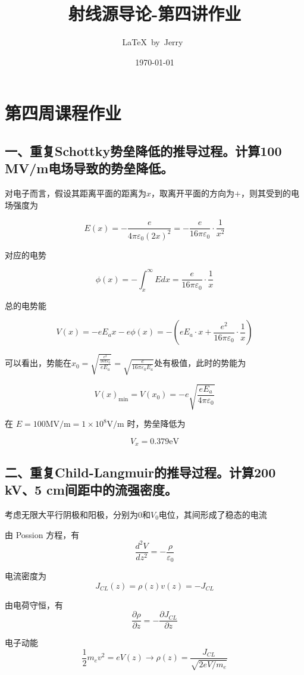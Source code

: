 \documentclass{article}
\title{射线源导论-第四讲作业}
\author{\LaTeX\ by\ Jerry\ }
\date{\today}
\begin{document}
\pagestyle{fancy}

\fancyhead[R]{\today}

\section*{第四周课程作业}

\subsection*{一、重复Schottky势垒降低的推导过程。计算100 MV/m电场导致的势垒降低。}

对电子而言，假设其距离平面的距离为$x$，取离开平面的方向为$+$，则其受到的电场强度为

$$E(x) = -\frac{e}{4\pi\varepsilon_0(2x)^2} = -\frac{e}{16\pi\varepsilon_0}\cdot\frac{1}{x^2}$$

对应的电势

$$\phi(x) = -\int_x^{\infty} Edx = \frac{e}{16\pi\varepsilon_0}\cdot\frac{1}{x}$$

总的电势能

$$ V(x) = -eE_ax - e\phi(x) = - (eE_a \cdot x + \frac{e^2}{16\pi\varepsilon_0}\cdot\frac{1}{x})$$

可以看出，势能在$x_0 = \sqrt{\frac{\frac{e^2}{16\pi\varepsilon_0}}{eE_a}} = \sqrt{\frac{e}{16\pi\varepsilon_0E_a}}$处有极值，此时的势能为

$$V(x)_{\text{min}} = V(x_0) = -e\sqrt{\frac{eE_a}{4\pi\varepsilon_0}}$$

在 $E = 100\text{MV/m} = 1 \times 10^8 \text{V/m}$ 时，势垒降低为

$$V_x = 0.379\text{eV}$$

\subsection*{二、重复Child-Langmuir的推导过程。计算200 kV、5 cm间距中的流强密度。}

考虑无限大平行阴极和阳极，分别为$0$和$V_0$电位，其间形成了稳态的电流

由 Possion 方程，有 $$ \frac{d^2V}{dz^2} = -\frac{\rho}{\varepsilon_0} $$

电流密度为 $$ J_{CL}(z) = \rho(z) v(z) = -J_{CL} $$

由电荷守恒，有 $$ \frac{\partial\rho}{\partial z} = -\frac{\partial J_{CL}}{\partial z} $$

电子动能 $$ \frac{1}{2}m_ev^2 = eV(z) \rightarrow \rho(z) = \frac{J_{CL}}{\sqrt{2eV/m_e}} $$
\end{document}
